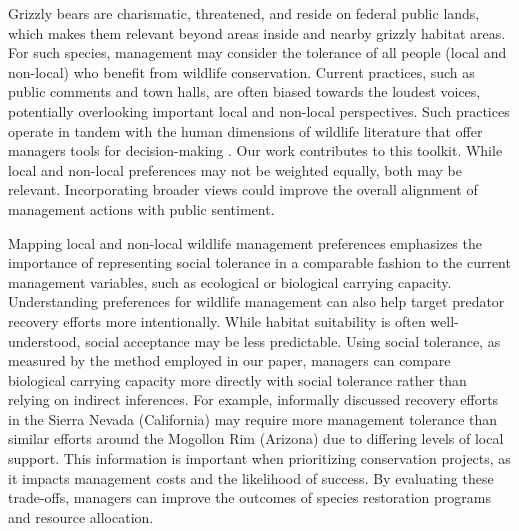 \documentclass[english,12pt]{article}
\begin{document}
Grizzly bears are charismatic, threatened, and reside on federal public lands, which makes them relevant beyond areas inside and nearby grizzly habitat areas. For such species, management may consider the tolerance of all people (local and non-local) who benefit from wildlife conservation. Current practices, such as public comments and town halls, are often biased towards the loudest voices, potentially overlooking important local and non-local perspectives. Such practices operate in tandem with the human dimensions of wildlife literature that offer managers tools for decision-making \citep{bruskotter2014determining, pooley2021rethinking, bockarjova2022estimating}. Our work contributes to this toolkit. While local and non-local preferences may not be weighted equally, both may be relevant. Incorporating broader views could improve the overall alignment of management actions with public sentiment. 

Mapping local and non-local wildlife management preferences emphasizes the importance of representing social tolerance in a comparable fashion to the current management variables, such as ecological or biological carrying capacity. Understanding preferences for wildlife management can also help target predator recovery efforts more intentionally. While habitat suitability is often well-understood, social acceptance may be less predictable. Using social tolerance, as measured by the method employed in our paper, managers can compare biological carrying capacity more directly with social tolerance rather than relying on indirect inferences. For example, informally discussed recovery efforts in the Sierra Nevada (California) may require more management tolerance than similar efforts around the Mogollon Rim (Arizona) due to differing levels of local support. This information is important when prioritizing conservation projects, as it impacts management costs and the likelihood of success. By evaluating these trade-offs, managers can improve the outcomes of species restoration programs and resource allocation. 
\end{document}
